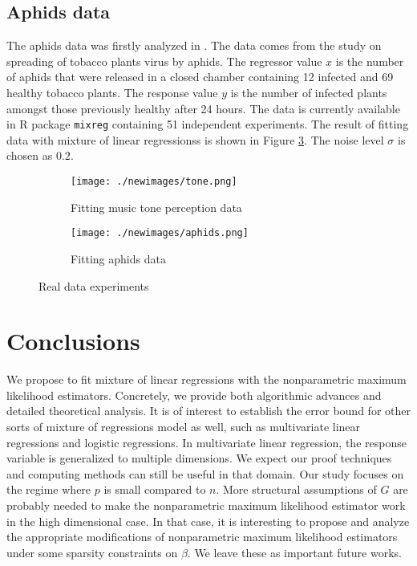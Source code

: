 \documentclass[11pt]{article}
\numberwithin{equation}{section}
\begin{document}
\subsection{Aphids data}
The aphids data was firstly analyzed in \citet{boiteau1998rate}. The data comes from the study on spreading of tobacco plants virus by aphids. The regressor value $x$ is the number of aphids that were released in a closed chamber containing 12 infected and 69 healthy tobacco plants. The response value $y$ is the number of infected plants amongst those previously healthy after 24 hours. The data is currently available in R package \texttt{mixreg} \citep{boiteau1998rate} containing 51 independent experiments. The result of fitting data with mixture of linear regressionss is shown in Figure \ref{fig:aphidsdata}. The noise level $\sigma$ is chosen as $0.2$.

\begin{figure}[!htbp]
\begin{subfigure}{0.5\textwidth}
\texttt{[image: ./newimages/tone.png]}
\caption{Fitting music tone perception data}
\label{fig:tonedata}
\end{subfigure}
\begin{subfigure}{0.5\textwidth}
\texttt{[image: ./newimages/aphids.png]}
\caption{Fitting aphids data}
\label{fig:aphidsdata}
\end{subfigure}
\caption{Real data experiments}
\end{figure}

\section{Conclusions}

\label{section:conclusions}
We propose to fit mixture of linear regressions  with the nonparametric maximum likelihood estimators. Concretely, we provide both algorithmic advances and detailed theoretical analysis. It is of interest to establish the error bound for other sorts of mixture of regressions model as well, such as multivariate linear regressions and logistic regressions. In multivariate linear regression, the response variable is generalized to multiple dimensions. We expect our proof techniques and computing methods can still be useful in that domain. Our study focuses on the regime where $p$ is small compared to $n$. More structural assumptions of $G$ are probably needed to make the nonparametric maximum likelihood estimator work in the high dimensional case. In that case, it is interesting to propose and analyze the appropriate modifications of nonparametric maximum likelihood estimators under some sparsity constraints on $\beta$. We leave these as important future works.
\end{document}
